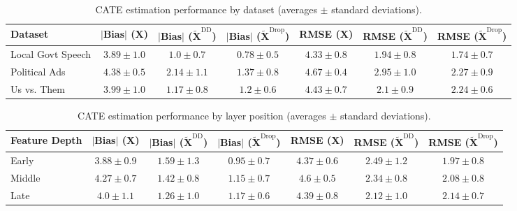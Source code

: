 \begin{table}[ht!]
    \raggedright
    \small
    \caption{CATE estimation performance by dataset (averages $\pm$ standard deviations).}
    \begin{sc}
    \begin{tabular}{lcccccc}
    \toprule
    \textbf{Dataset} & \textbf{$|$Bias$|$ ($\mathbf{X}$)} & \textbf{$|$Bias$|$ ($\mathbf{\widetilde{X}}^{\textrm{DD}}$)} & \textbf{$|$Bias$|$ ($\mathbf{\widetilde{X}}^{\textrm{Drop}}$)} & \textbf{RMSE ($\mathbf{X}$)} & \textbf{RMSE ($\mathbf{\widetilde{X}}^{\textrm{DD}}$)} & \textbf{RMSE ($\mathbf{\widetilde{X}}^{\textrm{Drop}}$)}\\
    \midrule
    Local Govt Speech & $\mathbf{3.89 \pm 1.0}$ & $\mathbf{1.0 \pm 0.7}$ & $\mathbf{0.78 \pm 0.5}$ & $\mathbf{4.33 \pm 0.8}$ & $\mathbf{1.94 \pm 0.8}$ & $\mathbf{1.74 \pm 0.7}$\\
    Political Ads & $4.38 \pm 0.5$ & $2.14 \pm 1.1$ & $1.37 \pm 0.8$ & $4.67 \pm 0.4$ & $2.95 \pm 1.0$ & $2.27 \pm 0.9$\\
    Us vs. Them & $3.99 \pm 1.0$ & $1.17 \pm 0.8$ & $1.2 \pm 0.6$ & $4.43 \pm 0.7$ & $2.1 \pm 0.9$ & $2.24 \pm 0.6$\\
    \bottomrule
    \end{tabular}
    \end{sc}
    \end{table}

    \begin{table}[ht!]
    \raggedright
    \small
    \caption{CATE estimation performance by layer position (averages $\pm$ standard deviations).}
    \begin{sc}
    \begin{tabular}{lcccccc}
    \toprule
    \textbf{Feature Depth} & \textbf{$|$Bias$|$ ($\mathbf{X}$)} & \textbf{$|$Bias$|$ ($\mathbf{\widetilde{X}}^{\textrm{DD}}$)} & \textbf{$|$Bias$|$ ($\mathbf{\widetilde{X}}^{\textrm{Drop}}$)} & \textbf{RMSE ($\mathbf{X}$)} & \textbf{RMSE ($\mathbf{\widetilde{X}}^{\textrm{DD}}$)} & \textbf{RMSE ($\mathbf{\widetilde{X}}^{\textrm{Drop}}$)}\\
    \midrule
    Early & $\mathbf{3.88 \pm 0.9}$ & $1.59 \pm 1.3$ & $\mathbf{0.95 \pm 0.7}$ & $\mathbf{4.37 \pm 0.6}$ & $2.49 \pm 1.2$ & $\mathbf{1.97 \pm 0.8}$\\
    Middle & $4.27 \pm 0.7$ & $1.42 \pm 0.8$ & $1.15 \pm 0.7$ & $4.6 \pm 0.5$ & $2.34 \pm 0.8$ & $2.08 \pm 0.8$\\
    Late & $4.0 \pm 1.1$ & $\mathbf{1.26 \pm 1.0}$ & $1.17 \pm 0.6$ & $4.39 \pm 0.8$ & $\mathbf{2.12 \pm 1.0}$ & $2.14 \pm 0.7$\\
    \bottomrule
    \end{tabular}
    \end{sc}
    \end{table}
